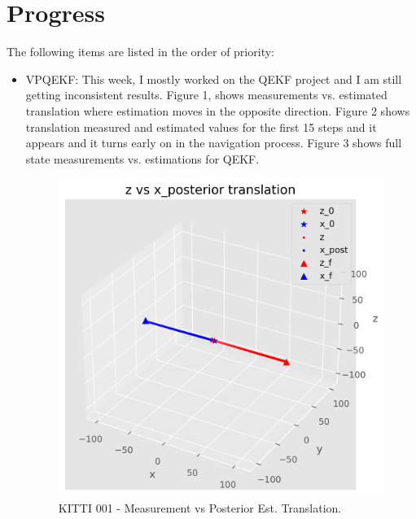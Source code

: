 \documentclass[11pt]{article}
\begin{document}
\section{Progress}
The following items are listed in the order of priority:
\begin{itemize}
      \item VPQEKF: This week, I mostly worked on the QEKF project and I am still getting
      inconsistent results. Figure 1, shows measurements vs. estimated translation where estimation moves in the opposite direction. Figure 2 shows translation measured and estimated values for the first 15 steps and it appears and it turns early on in the navigation process.
      Figure 3 shows full state measurements vs. estimations for QEKF.

      \begin{figure}
            \includegraphics[width=\linewidth]{fig01.png}
            \caption{KITTI 001 - Measurement vs Posterior Est. Translation.}
            \label{fig:meas_vs_post}
      \end{figure}


\end{itemize}
\end{document}
